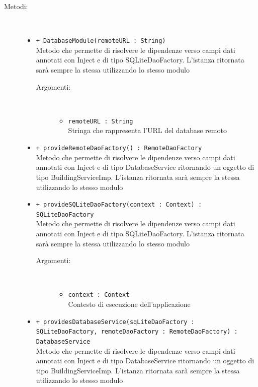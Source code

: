 \documentclass[../DefinizioneDiProdotto.tex]{subfiles}
\begin{document}
\begin{description}
\begin{itemize}
	\end{itemize}
	\item[Metodi:] \
	\begin{itemize}
		\item \texttt{+ DatabaseModule(remoteURL : String)}\\
		Metodo che permette di risolvere le dipendenze verso campi dati annotati con Inject e di tipo SQLiteDaoFactory. L'istanza ritornata sarà sempre la stessa utilizzando lo stesso modulo
		\begin{description}
			\item[Argomenti:] \
			\begin{itemize}
				\item \texttt{remoteURL : String}\\
				Stringa che rappresenta l'URL del database remoto\end{itemize}
		\end{description}
		\item \texttt{+ provideRemoteDaoFactory() : RemoteDaoFactory}\\
		Metodo che permette di risolvere le dipendenze verso campi dati annotati con Inject e di tipo DatabaseService ritornando un oggetto di tipo BuildingServiceImp. L'istanza ritornata sarà sempre la stessa utilizzando lo stesso modulo
		\item \texttt{+ provideSQLiteDaoFactory(context : Context) : SQLiteDaoFactory}\\
		Metodo che permette di risolvere le dipendenze verso campi dati annotati con Inject e di tipo SQLiteDaoFactory. L'istanza ritornata sarà sempre la stessa utilizzando lo stesso modulo
		\begin{description}
			\item[Argomenti:] \
			\begin{itemize}
				\item \texttt{context : Context}\\
				Contesto di esecuzione dell'applicazione\end{itemize}
		\end{description}
		\item \texttt{+ providesDatabaseService(sqLiteDaoFactory : SQLiteDaoFactory, remoteDaoFactory : RemoteDaoFactory) : DatabaseService}\\
		Metodo che permette di risolvere le dipendenze verso campi dati annotati con Inject e di tipo DatabaseService ritornando un oggetto di tipo BuildingServiceImp. L'istanza ritornata sarà sempre la stessa utilizzando lo stesso modulo

\end{itemize}
\end{description}
\end{document}
